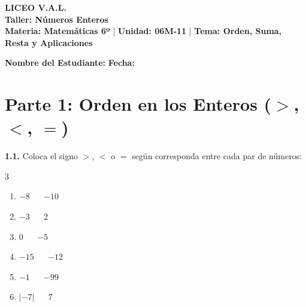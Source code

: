 \documentclass[11pt, letterpaper]{article}
\newif\ifshowanswers
\newcommand{\answer}[1]{
	\ifshowanswers
	\par\vspace{0.1cm}
	\begin{tcolorbox}[colback=blue!5!white, colframe=blue!60!white, arc=1mm, boxrule=0.5pt, title=\textbf{\footnotesize SOLUCIÓN PASO A PASO (DOCENTE)}]
		\color{blue!80!black}\footnotesize #1
	\end{tcolorbox}
	\par\vspace{0.1cm}
	\else
	\par\vspace{0.2cm}
	\fi
}
\begin{document}
	
	\begin{center}
		{\Large \textbf{\color{valblue} LICEO V.A.L.}}\\[0.1cm]
		{\large \textbf{Taller: Números Enteros}}\\[0.1cm]
		{\small \textbf{Materia: Matemáticas 6º} \quad | \quad \textbf{Unidad: 06M-11} \quad | \quad \textbf{Tema: Orden, Suma, Resta y Aplicaciones}}
	\end{center}
	
	\vspace{0.2cm}
	\noindent \textbf{Nombre del Estudiante:} \underline{\hspace{8.5cm}} \hfill \textbf{Fecha:} \underline{\hspace{3cm}}
	
	\vspace{0.3cm}
	
	\section*{\color{valblue} Parte 1: Orden en los Enteros ($>$, $<$, $=$)}
	
	\noindent \textbf{1.1.} Coloca el signo \textbf{$>$}, \textbf{$<$} o \textbf{$=$} según corresponda entre cada par de números:
	\begin{multicols}{3}
		\begin{enumerate}[label=\alph*), itemsep=0.1cm]
			\item $-8$ \ \underline{\hspace{0.8cm}} \ $-10$
			\item $-3$ \ \underline{\hspace{0.8cm}} \ $2$
			\item $0$ \ \underline{\hspace{0.8cm}} \ $-5$
			\item $-15$ \ \underline{\hspace{0.8cm}} \ $-12$
			\item $-1$ \ \underline{\hspace{0.8cm}} \ $-99$
			\item $|-7|$ \ \underline{\hspace{0.8cm}} \ $7$
		\end{enumerate}
	\end{multicols}
	
	\answer{
		\textbf{Respuestas:} 
		a) $>$ \quad b) $<$ \quad c) $>$ \quad d) $<$ \quad e) $>$ \quad f) $=$
	}
	
\end{document}
